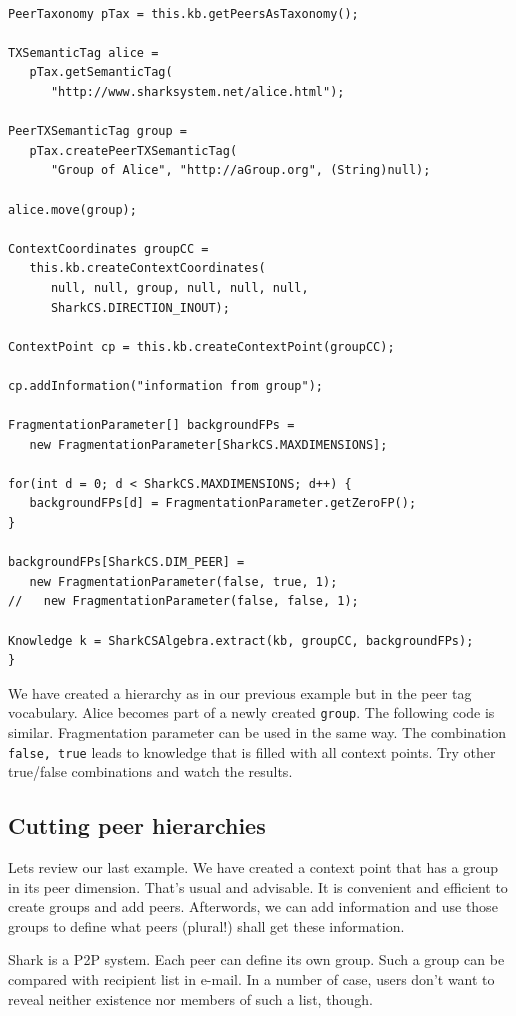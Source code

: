 \begin{verbatim}

PeerTaxonomy pTax = this.kb.getPeersAsTaxonomy();

TXSemanticTag alice =
   pTax.getSemanticTag(
      "http://www.sharksystem.net/alice.html");

PeerTXSemanticTag group =
   pTax.createPeerTXSemanticTag(
      "Group of Alice", "http://aGroup.org", (String)null);

alice.move(group);

ContextCoordinates groupCC =
   this.kb.createContextCoordinates(
      null, null, group, null, null, null,
      SharkCS.DIRECTION_INOUT);

ContextPoint cp = this.kb.createContextPoint(groupCC);

cp.addInformation("information from group");

FragmentationParameter[] backgroundFPs =
   new FragmentationParameter[SharkCS.MAXDIMENSIONS];

for(int d = 0; d < SharkCS.MAXDIMENSIONS; d++) {
   backgroundFPs[d] = FragmentationParameter.getZeroFP();
}

backgroundFPs[SharkCS.DIM_PEER] =
   new FragmentationParameter(false, true, 1);
//   new FragmentationParameter(false, false, 1);

Knowledge k = SharkCSAlgebra.extract(kb, groupCC, backgroundFPs);
}
\end{verbatim}

We have created a hierarchy as in our previous example but in the peer tag vocabulary.
Alice becomes part of a newly created {\tt group}. The following code is similar. Fragmentation parameter can be used in the same way. The combination
{\tt false, true} leads to knowledge that is filled with all context points. Try other true/false combinations and watch the results.

\subsection{Cutting peer hierarchies}
Lets review our last example. We have created a context point that has a group in its peer dimension. That's usual and advisable. It is convenient and efficient to create groups and add peers. Afterwords, we can add information and use those groups to define what peers (plural!) shall get these information.

Shark is a P2P system. Each peer can define its own group. Such a group can be compared with recipient list in e-mail. In a number of case, users don't want to reveal neither existence nor members of such a list, though.

